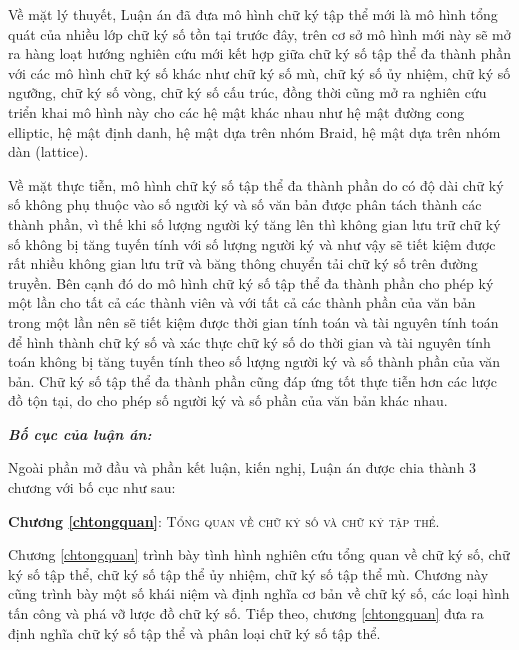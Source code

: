Về mặt lý thuyết, Luận án đã đưa mô hình chữ ký tập thể mới là mô hình tổng quát của nhiều lớp chữ ký số tồn tại trước đây, trên cơ sở mô hình mới này sẽ mở ra hàng loạt hướng nghiên cứu mới kết hợp giữa chữ ký số tập thể đa thành phần với các mô hình chữ ký số khác như chữ ký số mù, chữ ký số ủy nhiệm, chữ ký số ngưỡng, chữ ký số vòng, chữ ký số cấu trúc, đồng thời cũng mở ra nghiên cứu triển khai mô hình này cho các hệ mật khác nhau như hệ mật đường cong elliptic, hệ mật định danh, hệ mật dựa trên nhóm Braid, hệ mật dựa trên nhóm dàn (lattice).

Về mặt thực tiễn, mô hình chữ ký số tập thể đa thành phần do có độ dài chữ ký số không phụ thuộc vào số người ký và số văn bản được phân tách thành các thành phần, vì thế khi số lượng người ký tăng lên thì không gian lưu trữ chữ ký số không bị tăng tuyến tính với số lượng người ký và như vậy sẽ tiết kiệm được rất nhiều không gian lưu trữ và băng thông chuyển tải chữ ký số trên đường truyền. Bên cạnh đó do mô hình chữ ký số tập thể đa thành phần cho phép ký một lần cho tất cả các thành viên và với tất cả các thành phần của văn bản trong một lần nên sẽ tiết kiệm được thời gian tính toán và tài nguyên tính toán để hình thành chữ ký số và xác thực chữ ký số do thời gian và tài nguyên tính toán không bị tăng tuyến tính theo số lượng người ký và số thành phần của văn bản. Chữ ký số tập thể đa thành phần cũng đáp ứng tốt thực tiễn hơn các lược đồ tộn tại, do cho phép số người ký và số phần của văn bản khác nhau.


\textit{\textbf{Bố cục của luận án:}}

Ngoài phần mở đầu và phần kết luận, kiến nghị, Luận án được chia thành 3 chương với bố cục như sau:

%


\textbf{Chương \ref{chtongquan}}: \textsc{Tổng quan về chữ ký số và chữ ký tập thể}.

Chương  \ref{chtongquan} trình bày tình hình nghiên cứu tổng quan về chữ ký số, chữ ký số tập thể, chữ ký số tập thể ủy nhiệm, chữ ký số tập thể mù. Chương này cũng trình bày một số khái niệm và định nghĩa cơ bản về chữ ký số, các loại hình tấn công và phá vỡ lược đồ chữ ký số. Tiếp theo,  chương \ref{chtongquan} đưa ra định nghĩa chữ ký số tập thể và phân loại chữ ký số tập thể.

